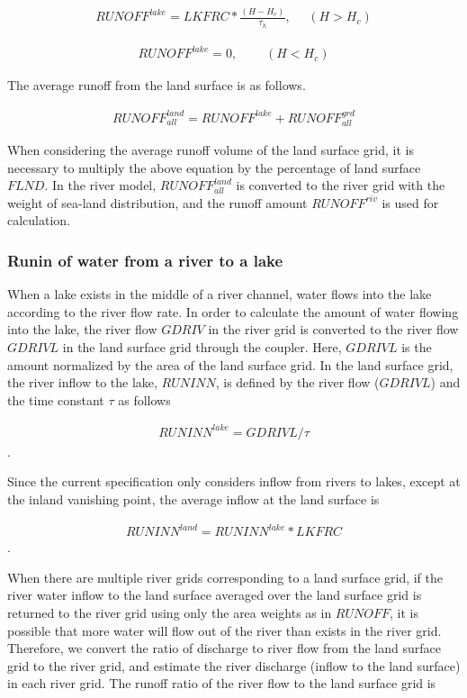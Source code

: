 \begin{eqnarray} RUNOFF^{lake} = LKFRC * \frac{(H-H_c)}{\tau_h},~~~~~~ (H>H_c) \end{eqnarray}

\begin{eqnarray} RUNOFF^{lake} = 0,~~~~~~~~~~ (H<H_c) \end{eqnarray}

The average runoff from the land surface is as follows.

\begin{eqnarray} RUNOFF^{land}_{all} = RUNOFF^{lake} + RUNOFF^{grd}_{all} \end{eqnarray}

When considering the average runoff volume of the land surface grid, it
is necessary to multiply the above equation by the percentage of land
surface \(FLND\). In the river model, \(RUNOFF^{land}_{all}\) is
converted to the river grid with the weight of sea-land distribution,
and the runoff amount \(RUNOFF^{riv}\) is used for calculation.

\hypertarget{runin-of-water-from-a-river-to-a-lake}{%
\subsubsection{Runin of water from a river to a
lake}\label{runin-of-water-from-a-river-to-a-lake}}

When a lake exists in the middle of a river channel, water flows into
the lake according to the river flow rate. In order to calculate the
amount of water flowing into the lake, the river flow \(GDRIV\) in the
river grid is converted to the river flow \(GDRIVL\) in the land surface
grid through the coupler. Here, \(GDRIVL\) is the amount normalized by
the area of the land surface grid. In the land surface grid, the river
inflow to the lake, \(RUNINN\), is defined by the river flow
(\(GDRIVL\)) and the time constant \(\tau\) as follows

\begin{eqnarray} RUNINN^{lake}=GDRIVL/\tau \end{eqnarray}.

Since the current specification only considers inflow from rivers to
lakes, except at the inland vanishing point, the average inflow at the
land surface is

\begin{eqnarray} RUNINN^{land}=RUNINN^{lake}*LKFRC \end{eqnarray}.

When there are multiple river grids corresponding to a land surface
grid, if the river water inflow to the land surface averaged over the
land surface grid is returned to the river grid using only the area
weights as in \(RUNOFF\), it is possible that more water will flow out
of the river than exists in the river grid. Therefore, we convert the
ratio of discharge to river flow from the land surface grid to the river
grid, and estimate the river discharge (inflow to the land surface) in
each river grid. The runoff ratio of the river flow to the land surface
grid is

